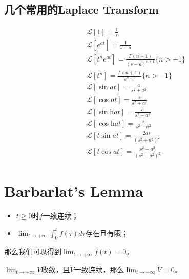 \documentclass[lang=cn,10pt]{elegantbook}
\begin{document}
\subsection{几个常用的Laplace Transform}
\begin{equation*}
	\begin{aligned}
		 & \mathcal{L}\left[1\right]=\frac1s                                                      \\
		 & \mathcal{L}\left[e^{at}\right]=\frac{1}{s-a}                                           \\
		 & \mathcal{L}\left[t^{n}e^{at}\right]=\frac{\Gamma(n+1)}{\left(s-a\right)^{n+1}}\{n>-1\} \\
		 & \mathcal{L}\left[t^n\right]=\frac{\Gamma(n+1)}{s^{n+1}}\{n>-1\}                        \\
		 & \mathcal{L}\left[\sin at\right]=\frac{a}{s^2+a^2}                                      \\
		 & \mathcal{L}\left[\cos at\right]=\frac{s}{s^{2}+a^{2}}                                  \\
		 & \mathcal{L}\left[\sin\text{h}at\right]=\frac{a}{s^2-a^2}                               \\
		 & \mathcal{L}\left[\cos\text{h}at\right]=\frac{s}{s^2-a^2}                               \\
		 & \mathcal{L}\left[t\sin at\right]=\frac{2as}{\left(s^2+a^2\right)^2}                    \\
		 & \mathcal{L}\left[t\cos at\right]=\frac{s^{2}-a^{2}}{\left(s^{2}+a^{2}\right)^{2}}
	\end{aligned}
\end{equation*}

\section{Barbarlat's Lemma}
\begin{theorem}[Theorem 1]
	\begin{itemize}
		\item $t\geq 0$时$f$一致连续；
		\item $\lim_{t\to+\infty}\int_{0}^{t}f(\tau)d\tau $存在且有限；
	\end{itemize}
	那么我们可以得到$\lim_{t\to+\infty}f(t)=0$。
\end{theorem}

\begin{theorem}[Theorem 2]
	$\lim_{t \to +\infty}V$收敛，且$\dot{V}$一致连续，那么$\lim_{t \to +\infty}\dot{V} = 0$。
\end{theorem}
\end{document}
